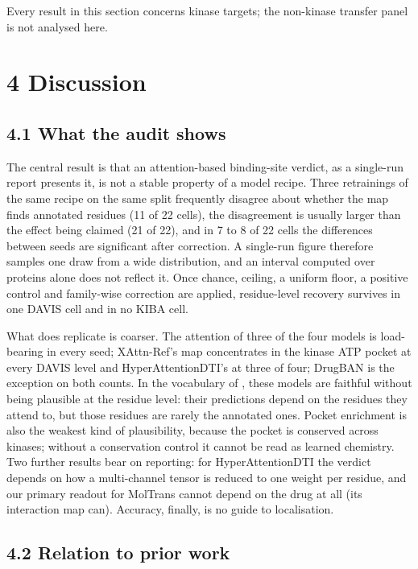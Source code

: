 \documentclass[
  11pt,
]{article}
\begin{document}
Every result in this section concerns kinase targets; the non-kinase transfer panel is not analysed here.

\section{4 Discussion}\label{discussion}

\subsection{4.1 What the audit shows}\label{what-the-audit-shows}

The central result is that an attention-based binding-site verdict, as a single-run report presents it, is not a stable property of a model recipe. Three retrainings of the same recipe on the same split frequently disagree about whether the map finds annotated residues (11 of 22 cells), the disagreement is usually larger than the effect being claimed (21 of 22), and in 7 to 8 of 22 cells the differences between seeds are significant after correction. A single-run figure therefore samples one draw from a wide distribution, and an interval computed over proteins alone does not reflect it. Once chance, ceiling, a uniform floor, a positive control and family-wise correction are applied, residue-level recovery survives in one DAVIS cell and in no KIBA cell.

What does replicate is coarser. The attention of three of the four models is load-bearing in every seed; XAttn-Ref's map concentrates in the kinase ATP pocket at every DAVIS level and HyperAttentionDTI's at three of four; DrugBAN is the exception on both counts. In the vocabulary of \citet{Jacovi2020}, these models are faithful without being plausible at the residue level: their predictions depend on the residues they attend to, but those residues are rarely the annotated ones. Pocket enrichment is also the weakest kind of plausibility, because the pocket is conserved across kinases; without a conservation control it cannot be read as learned chemistry. Two further results bear on reporting: for HyperAttentionDTI the verdict depends on how a multi-channel tensor is reduced to one weight per residue, and our primary readout for MolTrans cannot depend on the drug at all (its interaction map can). Accuracy, finally, is no guide to localisation.

\subsection{4.2 Relation to prior work}\label{relation-to-prior-work}
\end{document}
